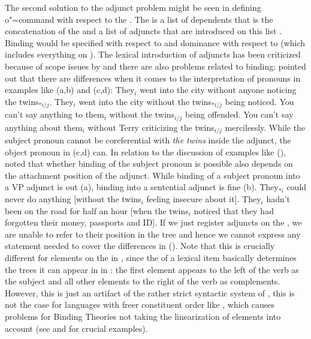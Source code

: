 \documentclass[output=paper,biblatex,babelshorthands,newtxmath,draftmode,colorlinks,citecolor=brown]{langscibook}
\begin{document}
The second solution to the adjunct problem might be seen in defining o"=command with respect to the \depsl. The \depsl is a list
of dependents that is the concatenation of the \argstl and a list of adjuncts that are introduced on
this list \citep*[]{BMS2001a}. Binding would be specified with respect to \argst and dominance with
respect to \deps (which includes everything on \argst). The lexical introduction of adjuncts has
been criticized because of scope issues by \citet[]{LH2006a} and there are also problems related to
binding: \citet[]{HL96a} pointed out that there are differences when it comes to the
interpretation of pronouns in examples like (a,b) and (c,d):
\eal
\ex They$_i$ went into the city without anyone noticing the twins$_{*i/j}$.
\ex They$_i$ went into the city without the twins$_{*i/j}$ being noticed.
\ex You can't say anything to them$_i$ without the twins$_{i/j}$ being offended.
\ex You can't say anything about them$_i$ without Terry criticizing the twins$_{i/j}$ mercilessly.
\zl
While the subject pronoun cannot be coreferential with \emph{the twins} inside the adjunct, the object pronoun in
(c,d) can.
In relation to the discussion of examples like (), \citet[]{Walker2011a} noted that whether binding of the subject pronoun is possible also
depends on the attachment position of the adjunct. While binding of a subject pronoun into a VP
adjunct is out (a), binding into a sentential adjunct is fine (b).
\ealnoraggedright
\ex They$_{*i}$ could never do anything [without the twins$_i$ feeling insecure about it].
\ex They$_i$ hadn’t been on the road for half an hour [when the twins$_i$ noticed that they had forgotten their money, passports and ID].
\zl
If we just register adjuncts on the \depsl, we are unable to refer to their
position in the tree and hence we cannot express any statement needed to cover the differences in
(). Note that this is crucially different for elements on the \argstl in , since the \argst of a lexical item
basically determines the trees it can appear in in : the first element appears to the left of
the verb as the subject and all other elements to the right of the verb as complements. However,
this is just an artifact of the rather strict syntactic system of , this is not the case for
languages with freer constituent order like , which causes problems for Binding Theories not
taking the linearization of elements into account (see \citealp[]{Grewendorf85a} and
\citealp[]{Riezler95a} for crucial examples).
\end{document}

